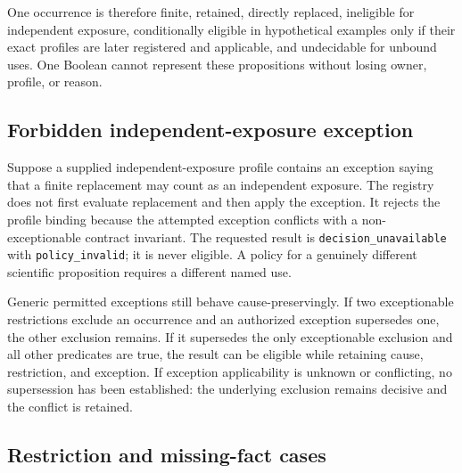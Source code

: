 One occurrence is therefore finite, retained, directly replaced, ineligible
for independent exposure, conditionally eligible in hypothetical examples
only if their exact profiles are later registered and applicable, and
undecidable for unbound uses. One Boolean cannot
represent these propositions without losing owner, profile, or reason.

\subsection{Forbidden independent-exposure exception}

Suppose a supplied independent-exposure profile contains an exception saying
that a finite replacement may count as an independent exposure. The registry
does not first evaluate replacement and then apply the exception. It rejects
the profile binding because the attempted exception conflicts with a
non-exceptionable contract invariant. The requested result is
\texttt{decision\_unavailable} with \texttt{policy\_invalid}; it is never
eligible. A policy for a genuinely different scientific proposition requires
a different named use.

Generic permitted exceptions still behave cause-preservingly. If two
exceptionable restrictions exclude an occurrence and an authorized exception
supersedes one, the other exclusion remains. If it supersedes the only
exceptionable exclusion and all other predicates are true, the result can be
eligible while retaining cause, restriction, and exception.
If exception applicability is unknown or conflicting, no supersession has
been established: the underlying exclusion remains decisive and the conflict
is retained.

\subsection{Restriction and missing-fact cases}

